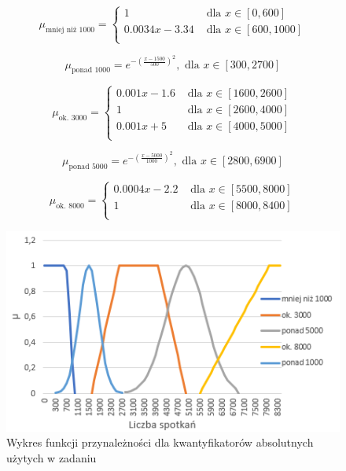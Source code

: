 \documentclass{classrep}
\begin{document}
  
 \begin{equation}
  \mu_{\text{mniej niż 1000}} =
    \begin{cases}
      1 & \text{ dla } x \in [0,600] \\
      0.0034x - 3.34 & \text{ dla } x \in [600,1000] \\
    \end{cases}  
\end{equation}

\begin{equation}
  \mu_{\text{ponad 1000}} = e^{-(\frac{x-1500}{500})^2}, \text{ dla } x \in [300,2700]
\end{equation}

\begin{equation}
  \mu_{\text{ok. 3000}} =
    \begin{cases}
      0.001x - 1.6 & \text{ dla } x \in [1600,2600] \\
      1 & \text{ dla } x \in [2600,4000] \\
      0.001x +5 & \text{ dla } x \in [4000,5000] \\
    \end{cases}  
\end{equation}

\begin{equation}
  \mu_{\text{ponad 5000}} =e^{-(\frac{x-5000}{1000})^2}, \text{ dla } x \in [2800,6900]
\end{equation}

\begin{equation}
  \mu_{\text{ok. 8000}} =
    \begin{cases}
      0.0004x - 2.2 & \text{ dla } x \in [5500,8000] \\
      1 & \text{ dla } x \in [8000,8400] \\
    \end{cases}  
\end{equation}

 \begin{figure}[H]
  \includegraphics{fp_qa.png}
  \caption{Wykres funkcji przynależności dla kwantyfikatorów absolutnych użytych w zadaniu}
\end{figure}
\end{document}
